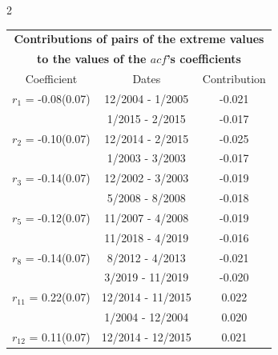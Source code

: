 
\thispagestyle{empty}
\begin{multicols}{2}{ 
\begin{tabular}{ccc}
\multicolumn{3}{c}{\textbf{Contributions of pairs of the extreme values} }  \vspace{-.10in}  \\ 
\multicolumn{3}{c}{ \textbf{to the values of the $acf$'s coefficients}} \\ 
\hline 
\hline                  Coefficient  &  Dates &  Contribution \\ 
\hline 
  $r_{ 1}$ = -0.08(0.07) &      12/2004 -  1/2005 &       -0.021    \vspace{-.10in} \\ 
  &        1/2015 -  2/2015 &       -0.017  \vspace{-.02in}   \\ \hline 
    $r_{ 2}$ = -0.10(0.07) &      12/2014 -  2/2015 &       -0.025    \vspace{-.10in} \\ 
  &        1/2003 -  3/2003 &       -0.017  \vspace{-.02in}   \\ \hline 
    $r_{ 3}$ = -0.14(0.07) &      12/2002 -  3/2003 &       -0.019    \vspace{-.10in} \\ 
  &        5/2008 -  8/2008 &       -0.018  \vspace{-.02in}   \\ \hline 
    $r_{ 5}$ = -0.12(0.07) &      11/2007 -  4/2008 &       -0.019    \vspace{-.10in} \\ 
  &       11/2018 -  4/2019 &       -0.016  \vspace{-.02in}   \\ \hline 
    $r_{ 8}$ = -0.14(0.07) &       8/2012 -  4/2013 &       -0.021    \vspace{-.10in} \\ 
  &        3/2019 - 11/2019 &       -0.020  \vspace{-.02in}   \\ \hline 
    $r_{11}$ = 0.22(0.07) &      12/2014 - 11/2015 &        0.022   \vspace{-.10in} \\  
&        1/2004 - 12/2004 &        0.020  \vspace{-.02in} \\ \hline 
  $r_{12}$ = 0.11(0.07) &      12/2014 - 12/2015 &        0.021   \vspace{-.10in} \\  

\end{tabular}}
\end{multicols}
